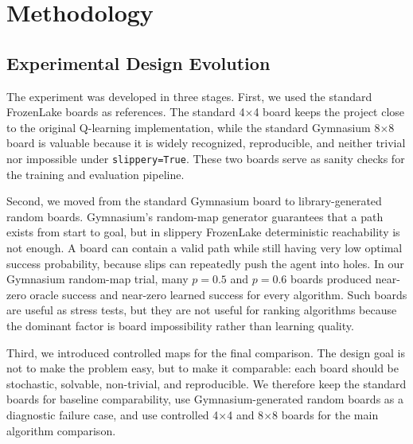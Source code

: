 \documentclass[10pt]{article}
\begin{document}
\section{Methodology}
\subsection{Experimental Design Evolution}
The experiment was developed in three stages. First, we used the standard FrozenLake boards as references. The standard 4$\times$4 board keeps the project close to the original Q-learning implementation, while the standard Gymnasium 8$\times$8 board is valuable because it is widely recognized, reproducible, and neither trivial nor impossible under \texttt{slippery=True}. These two boards serve as sanity checks for the training and evaluation pipeline.

Second, we moved from the standard Gymnasium board to library-generated random boards. Gymnasium's random-map generator guarantees that a path exists from start to goal, but in slippery FrozenLake deterministic reachability is not enough. A board can contain a valid path while still having very low optimal success probability, because slips can repeatedly push the agent into holes. In our Gymnasium random-map trial, many $p=0.5$ and $p=0.6$ boards produced near-zero oracle success and near-zero learned success for every algorithm. Such boards are useful as stress tests, but they are not useful for ranking algorithms because the dominant factor is board impossibility rather than learning quality.

Third, we introduced controlled maps for the final comparison. The design goal is not to make the problem easy, but to make it comparable: each board should be stochastic, solvable, non-trivial, and reproducible. We therefore keep the standard boards for baseline comparability, use Gymnasium-generated random boards as a diagnostic failure case, and use controlled 4$\times$4 and 8$\times$8 boards for the main algorithm comparison.

\end{document}
